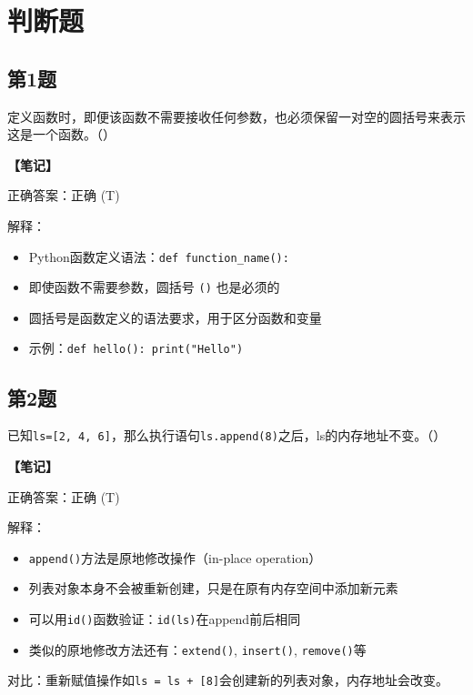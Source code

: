 \section{判断题}

\subsection{第1题}
定义函数时，即便该函数不需要接收任何参数，也必须保留一对空的圆括号来表示这是一个函数。（\quad）

\begin{mdframed}[linewidth=1pt, linecolor=black]
  \textbf{\color{red}【笔记】}

  正确答案：正确 (T)

  解释：
  \begin{itemize}
    \item Python函数定义语法：\texttt{def function\_name():}
    \item 即使函数不需要参数，圆括号 \texttt{()} 也是必须的
    \item 圆括号是函数定义的语法要求，用于区分函数和变量
    \item 示例：\texttt{def hello(): print("Hello")}
  \end{itemize}

\end{mdframed}

\subsection{第2题}
已知\texttt{ls=[2, 4, 6]}，那么执行语句\texttt{ls.append(8)}之后，ls的内存地址不变。（\quad）

\begin{mdframed}[linewidth=1pt, linecolor=black]
  \textbf{\color{red}【笔记】}

  正确答案：正确 (T)

  解释：
  \begin{itemize}
    \item \texttt{append()}方法是原地修改操作（in-place operation）
    \item 列表对象本身不会被重新创建，只是在原有内存空间中添加新元素
    \item 可以用\texttt{id()}函数验证：\texttt{id(ls)}在append前后相同
    \item 类似的原地修改方法还有：\texttt{extend()}, \texttt{insert()}, \texttt{remove()}等
  \end{itemize}

  对比：重新赋值操作如\texttt{ls = ls + [8]}会创建新的列表对象，内存地址会改变。

\end{mdframed}

